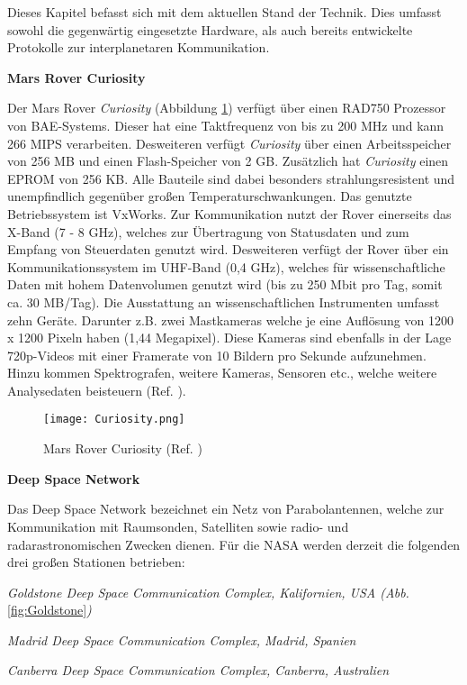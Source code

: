 \label{cap:standDerTechnik}
Dieses Kapitel befasst sich mit dem aktuellen Stand der Technik. Dies
umfasst sowohl die gegenw{\"a}rtig eingesetzte Hardware, als auch bereits
entwickelte Protokolle zur interplanetaren Kommunikation.


\textbf{Mars Rover Curiosity} 

Der Mars Rover \textit{Curiosity} (Abbildung \ref{fig:Curiosity}) verf{\"u}gt
{\"u}ber einen RAD750 Prozessor von BAE-Systems.
Dieser hat eine Taktfrequenz von bis zu 200 MHz und kann 266 MIPS
verarbeiten. Desweiteren verf{\"u}gt \textit{Curiosity} {\"u}ber einen
Arbeitsspeicher von 256 MB und einen Flash-Speicher von 2 GB. Zus{\"a}tzlich hat
\textit{Curiosity} einen EPROM von 256 KB. Alle Bauteile sind dabei besonders
strahlungsresistent und unempfindlich gegen{\"u}ber gro{\ss}en
Temperaturschwankungen. Das genutzte Betriebssystem ist VxWorks.
Zur Kommunikation nutzt der Rover einerseits das X-Band (7 - 8 GHz), welches zur
{\"U}bertragung von Statusdaten und zum Empfang von Steuerdaten genutzt wird.
Desweiteren verf{\"u}gt der Rover {\"u}ber ein Kommunikationssystem im UHF-Band
(0,4 GHz), welches f{\"u}r wissenschaftliche Daten mit hohem Datenvolumen
genutzt wird (bis zu 250 Mbit pro Tag, somit ca. 30 MB/Tag). Die Ausstattung an
wissenschaftlichen Instrumenten umfasst zehn Ger{\"a}te. Darunter z.B. zwei
Mastkameras welche je eine Aufl{\"o}sung von 1200 x 1200 Pixeln haben (1,44
Megapixel). Diese Kameras sind ebenfalls in der Lage 720p-Videos mit einer
Framerate von 10 Bildern pro Sekunde aufzunehmen. Hinzu kommen Spektrografen,
weitere Kameras, Sensoren etc., welche weitere Analysedaten beisteuern (Ref.
\cite{web5}).

\begin{figure}[H]
\centering
\texttt{[image: Curiosity.png]}
\caption{Mars Rover Curiosity (Ref. \cite{imgCuriosity})}
\label{fig:Curiosity}
\end{figure}

\textbf{Deep Space Network}

Das Deep Space Network bezeichnet ein Netz von Parabolantennen, welche zur
Kommunikation mit Raumsonden, Satelliten sowie radio-
und radarastronomischen Zwecken dienen. F{\"u}r die NASA werden derzeit die
folgenden drei gro{\ss}en Stationen betrieben:

\begin{compactenum}[a)]
\item \textit{Goldstone Deep Space Communication Complex, Kalifornien, USA
(Abb.} \ref{fig:Goldstone}\textit{)}
\item \textit{Madrid Deep Space Communication Complex, Madrid, Spanien}
\item \textit{Canberra Deep Space Communication Complex, Canberra, Australien}
\end{compactenum}

